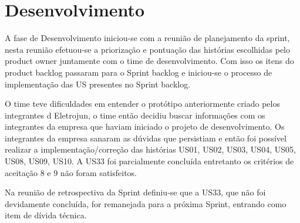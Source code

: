 \section{Desenvolvimento}

A fase de Desenvolvimento iniciou-se com a reunião de planejamento da sprint, nesta reunião efetuou-se a priorização e pontuação das histórias escolhidas pelo product owner juntamente com o time de desenvolvimento. Com isso os itens do product backlog passaram para o Sprint backlog e iniciou-se o processo de implementação das US presentes no Sprint backlog.

O time teve dificuldades em entender o protótipo anteriormente criado pelos integrantes d Eletrojun, o time então decidiu buscar informações com os integrantes da empresa que haviam iniciado o projeto de desenvolvimento. Os integrantes da empresa sanaram as dúvidas que persistiam e então foi possível realizar a implementação/correção das histórias US01, US02, US03, US04, US05, US08, US09, US10. A US33 foi parcialmente concluída entretanto os critérios de aceitação 8 e 9 não foram satisfeitos.

Na reunião de retrospectiva da Sprint definiu-se que a US33, que não foi devidamente concluída, for remanejada para a próxima Sprint, entrando como item de dívida técnica.
